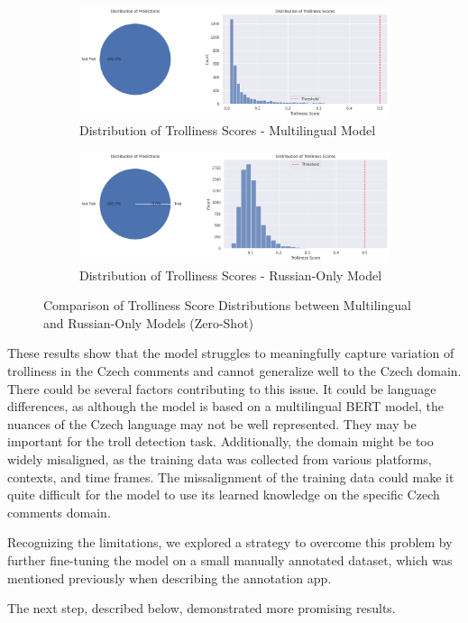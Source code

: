 \documentclass[twoside]{ctuthesis}
\theoremstyle{plain}
\theoremstyle{definition}
\theoremstyle{note}
\begin{document}
\begin{figure}[H]
    \centering
    \begin{subfigure}{0.8\linewidth}
        \centering
        \includegraphics[width=\linewidth]{figures/distribution_multi.png}
        \caption{Distribution of Trolliness Scores - Multilingual Model}
        \label{fig:distribution_multi}
    \end{subfigure}

    \vspace{1em}

    \begin{subfigure}{0.8\linewidth}
        \centering
        \includegraphics[width=\linewidth]{figures/russian_distribution.png}
        \caption{Distribution of Trolliness Scores - Russian-Only Model}
        \label{fig:russian_distribution}
    \end{subfigure}

    \caption{Comparison of Trolliness Score Distributions between Multilingual and Russian-Only Models (Zero-Shot)}
    \label{fig:distribution_comparison}
\end{figure}

These results show that the model struggles to meaningfully capture variation of trolliness in the Czech comments and cannot generalize well to the Czech domain. There could be several factors contributing to this issue. It could be language differences, as although the model is based on a multilingual BERT model, the nuances of the Czech language may not be well represented. They may be important for the troll detection task. Additionally, the domain might be too widely misaligned, as the training data was collected from various platforms, contexts, and time frames. The missalignment of the training data could make it quite difficult for the model to use its learned knowledge on the specific Czech comments domain.
\par 
Recognizing the limitations, we explored a strategy to overcome this problem by further fine-tuning the model on a small manually annotated dataset, which was mentioned previously when describing the annotation app.\par
The next step, described below, demonstrated more promising results.\par
\end{document}
